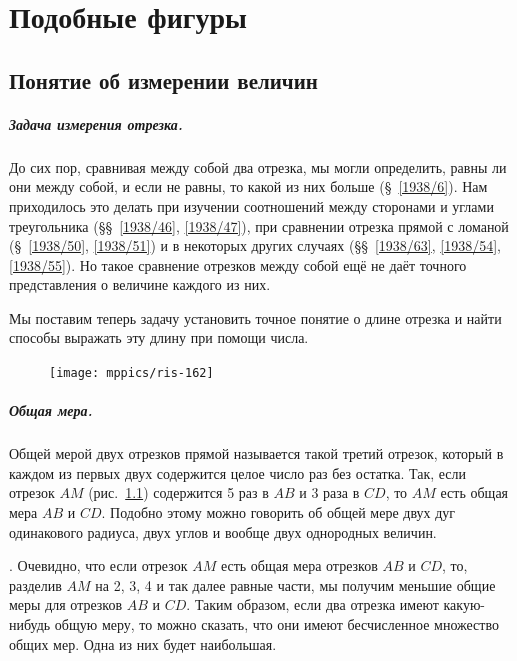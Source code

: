 \documentclass[oneside]{book}
\begin{document}
\chapter{Подобные фигуры}

\section{Понятие об измерении величин}

\paragraph{Задача измерения отрезка.}\label{1938/144}
До сих пор, сравнивая между собой два отрезка, мы могли определить, равны ли они между собой, и если не равны, то какой из них больше (§~\ref{1938/6}).
Нам приходилось это делать при изучении соотношений между сторонами и углами треугольника (§§~\ref{1938/46}, \ref{1938/47}), при сравнении отрезка прямой с ломаной (§~\ref{1938/50}, \ref{1938/51}) и в некоторых других случаях (§§~\ref{1938/63}, \ref{1938/54}, \ref{1938/55}).
Но такое сравнение отрезков между собой ещё не даёт точного представления о величине каждого из них.

Мы поставим теперь задачу установить точное понятие о длине отрезка и найти способы выражать эту длину при помощи числа.

\begin{figure}
\centering
\texttt{[image: mppics/ris-162]}
\caption{}\label{1938/ris-162}
\end{figure}

\paragraph{Общая мера.}\label{1938/145}
Общей мерой двух отрезков прямой называется такой третий отрезок, который в каждом из первых двух содержится целое число раз без остатка.
Так, если отрезок $AM$ (рис.~\ref{1938/ris-162}) содержится 5 раз в $AB$ и 3 раза в $CD$, то $AM$ есть общая мера $AB$ и $CD$.
Подобно этому можно говорить об общей мере двух дуг одинакового радиуса, двух углов и вообще двух однородных величин.

.
Очевидно, что если отрезок $AM$ есть общая мера
отрезков $AB$ и $CD$, то, разделив $AM$ на 2, 3, 4 и так далее равные
части, мы получим меньшие общие меры для отрезков $AB$ и $CD$.
Таким образом, если два отрезка имеют какую-нибудь общую меру, то можно сказать, что они имеют бесчисленное множество общих мер.
Одна из них будет наибольшая.
\end{document}
